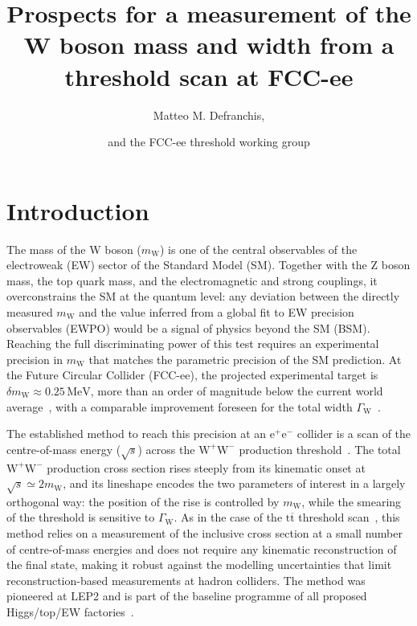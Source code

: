 \documentclass[a4paper,11pt]{article}
\title{Prospects for a measurement of the W boson mass and width from a \boldmath \texorpdfstring{\WW}{W+W-} threshold scan at FCC-ee}
\author[a,1]{Matteo M. Defranchis,\note{Corresponding author}}
\author[a]{and the FCC-ee \WW threshold working group\note{\textcolor{red}{Author list to be finalised.}}}
\affiliation[a]{CERN, Geneva, Switzerland}
\newcommand{\ttbar}{\ensuremath{\mathrm{t\overline{t}}}\xspace}
\newcommand{\WW}{\ensuremath{\mathrm{W^+W^-}}\xspace}
\newcommand{\sqrts}{\ensuremath{\sqrt{s}}\xspace}
\newcommand{\mW}{\ensuremath{m_\mathrm{W}}\xspace}
\newcommand{\GW}{\ensuremath{\Gamma_\mathrm{W}}\xspace}
\newcommand{\MeV}{\ensuremath{\,\mathrm{MeV}}\xspace}
\newcommand{\epm}{\ensuremath{\mathrm{e^+e^-}}\xspace}
\begin{document}
\maketitle

\section{Introduction}
\label{sec:intro}

The mass of the W boson (\mW) is one of the central observables of the
electroweak (EW) sector of the Standard Model (SM). Together with the Z
boson mass, the top quark mass, and the electromagnetic and strong
couplings, it overconstrains the SM at the quantum level: any deviation
between the directly measured \mW and the value inferred from a global
fit to EW precision observables (EWPO) would be a signal of physics
beyond the SM (BSM). Reaching the full discriminating power of this test
requires an experimental precision in \mW that matches the parametric
precision of the SM prediction. At the Future Circular Collider (FCC-ee),
the projected experimental target is $\delta\mW\approx 0.25\MeV$, more
than an order of magnitude below the current world
average~\cite{ParticleDataGroup:2024cfk}, with a comparable improvement
foreseen for the total width \GW~\cite{FCC:2025lpp}.

The established method to reach this precision at an \epm collider is a
scan of the centre-of-mass energy (\sqrts) across the \WW production
threshold~\cite{Fadin:1995fp,Beenakker:1996kt}. The total \WW production
cross section rises steeply from its kinematic onset at
$\sqrts \simeq 2\mW$, and its lineshape encodes the two parameters of
interest in a largely orthogonal way: the position of the rise is
controlled by \mW, while the smearing of the threshold is sensitive to
\GW. As in the case of the \ttbar threshold
scan~\cite{Defranchis:2025hfh}, this method relies on a measurement of
the inclusive cross section at a small number of centre-of-mass energies
and does not require any kinematic reconstruction of the final state,
making it robust against the modelling uncertainties that limit
reconstruction-based measurements at hadron colliders.
The method was pioneered at LEP2 and is part of the baseline programme
of all proposed Higgs/top/EW factories~\cite{deBlas:2024bmz}.
\end{document}
